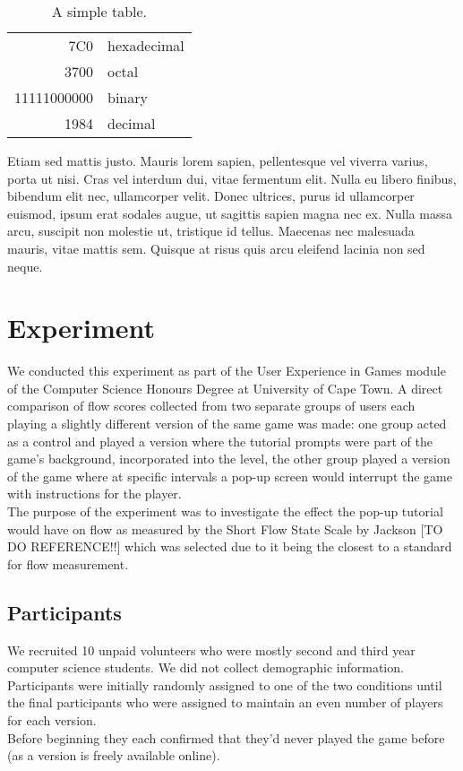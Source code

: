 \documentclass{acmsiggraph}
\begin{document}
\begin{table}[ht]
  \centering
  \caption{A simple table.}
  \begin{tabular}{|r|l|}
    \hline
    7C0 & hexadecimal \\
    3700 & octal \\ \cline{2-2}
    11111000000 & binary \\
    \hline \hline
    1984 & decimal \\
    \hline
  \end{tabular}
\end{table}
  
Etiam sed mattis justo. Mauris lorem sapien, pellentesque vel viverra varius, porta ut nisi. Cras vel interdum dui, vitae fermentum elit. Nulla eu libero finibus, bibendum elit nec, ullamcorper velit. Donec ultrices, purus id ullamcorper euismod, ipsum erat sodales augue, ut sagittis sapien magna nec ex. Nulla massa arcu, suscipit non molestie ut, tristique id tellus. Maecenas nec malesuada mauris, vitae mattis sem. Quisque at risus quis arcu eleifend lacinia non sed neque.

\section{Experiment}

We conducted this experiment as part of the User Experience in Games module of the Computer Science Honours Degree at University of Cape Town. A direct comparison of flow scores collected from two separate groups of users each playing a slightly different version of the same game was made: one group acted as a control and played a version where the tutorial prompts were part of the game's background, incorporated into the level, the other group played a version of the game where at specific intervals a pop-up screen would interrupt the game with instructions for the player.\\
The purpose of the experiment was to investigate the effect the pop-up tutorial would have on flow as measured by the Short Flow State Scale by Jackson [TO DO REFERENCE!!] which was selected due to it being the closest to a standard for flow measurement.

\subsection{Participants}

We recruited 10 unpaid volunteers who were mostly second and third year computer science students. We did not collect demographic information. Participants were initially randomly assigned to one of the two conditions until the final participants who were assigned to maintain an even number of players for each version.\\
Before beginning they each confirmed that they'd never played the game before (as a version is freely available online).
\end{document}
